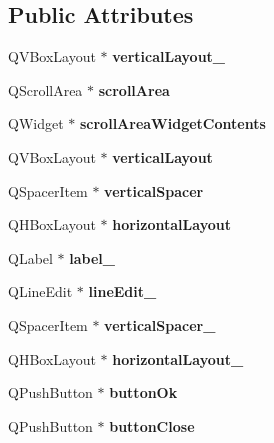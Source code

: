 \subsection*{Public Attributes}
\begin{DoxyCompactItemize}
\item 
\mbox{\label{class_ui___add_form_adef0edb81abd12cb024c81aad93896b5}} 
Q\+V\+Box\+Layout $\ast$ {\bfseries vertical\+Layout\+\_}
\item 
\mbox{\label{class_ui___add_form_ab8a12f52544a0525109406a0d8dde8c7}} 
Q\+Scroll\+Area $\ast$ {\bfseries scroll\+Area}
\item 
\mbox{\label{class_ui___add_form_aad8852d3c8319383f1acf689515d510d}} 
Q\+Widget $\ast$ {\bfseries scroll\+Area\+Widget\+Contents}
\item 
\mbox{\label{class_ui___add_form_a2eaa5a8b546d0f6687880a96fb4626a1}} 
Q\+V\+Box\+Layout $\ast$ {\bfseries vertical\+Layout}
\item 
\mbox{\label{class_ui___add_form_a6fbb169b2ad54a5d2c8010a93c1ff7ab}} 
Q\+Spacer\+Item $\ast$ {\bfseries vertical\+Spacer}
\item 
\mbox{\label{class_ui___add_form_a4890a306a5d81de99a2824af2f1d1a37}} 
Q\+H\+Box\+Layout $\ast$ {\bfseries horizontal\+Layout}
\item 
\mbox{\label{class_ui___add_form_a9ff3aae9fb1b21100e7276f6b05239b1}} 
Q\+Label $\ast$ {\bfseries label\+\_}
\item 
\mbox{\label{class_ui___add_form_a773b7a4d35a3bb3f8eeb013be96ca70d}} 
Q\+Line\+Edit $\ast$ {\bfseries line\+Edit\+\_}
\item 
\mbox{\label{class_ui___add_form_afa7929110288562f8d4415938f36c9f9}} 
Q\+Spacer\+Item $\ast$ {\bfseries vertical\+Spacer\+\_}
\item 
\mbox{\label{class_ui___add_form_abc192464f9c391d7f90faa6156cd5ac6}} 
Q\+H\+Box\+Layout $\ast$ {\bfseries horizontal\+Layout\+\_}
\item 
\mbox{\label{class_ui___add_form_a6f4cdce13483258e59719a2c184200d3}} 
Q\+Push\+Button $\ast$ {\bfseries button\+Ok}
\item 
\mbox{\label{class_ui___add_form_ae6f4a43836ad2a122492e6e4849e688a}} 
Q\+Push\+Button $\ast$ {\bfseries button\+Close}
\end{DoxyCompactItemize}


